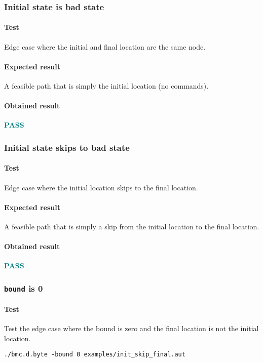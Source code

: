 \documentclass[letterpaper,12pt]{article}
\begin{document}
\subsubsection{Initial state is bad state}
\paragraph{Test}
Edge case where the initial and final location are the same node.
\paragraph{Expected result}
A feasible path that is simply the initial location (no commands).
\paragraph{Obtained result}
\textbf{\textcolor{teal}{PASS}}


\subsubsection{Initial state skips to bad state}
\paragraph{Test}
Edge case where the initial location skips to the final location.
\paragraph{Expected result}
A feasible path that is simply a skip from the initial location to the final location.
\paragraph{Obtained result}
\textbf{\textcolor{teal}{PASS}}

\subsubsection{\texttt{bound} is 0}

\paragraph{Test}
Test the edge case where the bound is zero and the final location is not the initial location.
\begin{verbatim}
./bmc.d.byte -bound 0 examples/init_skip_final.aut 
\end{verbatim}
\end{document}
